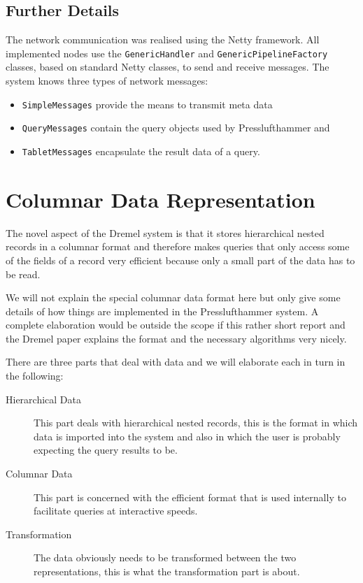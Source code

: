   \subsection{Further Details}
    The network communication was realised using the Netty framework.
    All implemented nodes use the \texttt{GenericHandler} and
    \texttt{GenericPipelineFactory} classes, based on standard Netty classes,
    to send and receive messages.
    The system knows three types of network messages:
    \begin{itemize}
      \item \texttt{SimpleMessages} provide the means to transmit meta data
      \item \texttt{QueryMessages} contain the query objects used by
        Presslufthammer and
      \item \texttt{TabletMessages} encapsulate the result data of a query.
    \end{itemize}


\section{Columnar Data Representation}
The novel aspect of the Dremel system is that it stores hierarchical nested
records in a columnar format and therefore makes queries that only
access some of the fields of a record very efficient because only a small
part of the data has to be read.

We will not explain the special columnar data format here but only give
some details of how things are implemented in the Presslufthammer
system. A complete elaboration would be outside the scope if this
rather short report and the Dremel paper \cite{melnik2010dremel}
explains the format and the necessary algorithms very nicely.

There are three parts that deal with data and we will elaborate each in
turn in the following:

\begin{description}
  \item[Hierarchical Data] This part deals with hierarchical nested records, this
    is the format in which data is imported into the system and also in which
    the user is probably expecting the query results to be.
  \item[Columnar Data] This part is concerned with the efficient format that is
    used internally to facilitate queries at interactive speeds.
  \item[Transformation] The data obviously needs to be transformed between the two
    representations, this is what the transformation part is about.
\end{description}

